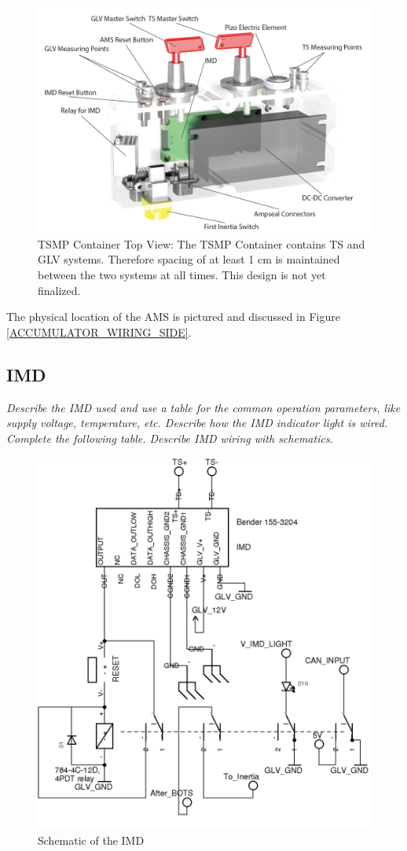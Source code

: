 \documentclass{article}
\begin{document}
\begin{figure}[H]
    \centering
    \includegraphics[width = 0.75 \textwidth]{TSMPcontainer2}
    \caption{TSMP Container Top View: The TSMP Container contains TS and GLV systems. Therefore spacing of at least 1 cm is maintained between the two systems at all times. This design is not yet finalized.}
    \label{TSMPcontainer1}
\end{figure}

The physical location of the AMS is pictured and discussed in Figure \ref{ACCUMULATOR_WIRING_SIDE}.

\subsection{IMD}

\textit{Describe the IMD used and use a table for the common operation parameters, like supply voltage, temperature, etc. Describe how the IMD indicator light is wired. Complete the following table. Describe IMD wiring with schematics.}

\begin{figure}[H]
    \centering
    \includegraphics[width = 0.6 \textwidth]{IMDonly}
    \caption{Schematic of the IMD}
    \label{imdschem}
\end{figure}
\end{document}
